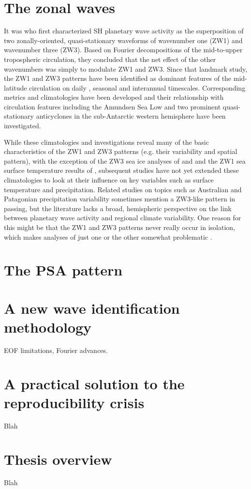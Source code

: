 \section{The zonal waves}

It was \citet{vanLoon1972} who first characterized SH planetary wave activity as the superposition of two zonally-oriented, quasi-stationary waveforms of wavenumber one (ZW1) and wavenumber three (ZW3). Based on Fourier decompositions of the mid-to-upper tropospheric circulation, they concluded that the net effect of the other wavenumbers was simply to modulate ZW1 and ZW3. Since that landmark study, the ZW1 and ZW3 patterns have been identified as dominant features of the mid-latitude circulation on daily \citep[e.g.][]{Kidson1988}, seasonal \citep[e.g.][]{Mo1985} and interannual \citep[e.g.][]{Karoly1989} timescales. Corresponding metrics and climatologies have been developed \citep{Raphael2004,Hobbs2007} and their relationship with circulation features including the Amundsen Sea Low \citep{Turner2013} and two prominent quasi-stationary anticyclones in the sub-Antarctic western hemisphere \citep{Hobbs2010} have been investigated.

While these climatologies and investigations reveal many of the basic characteristics of the ZW1 and ZW3 patterns (e.g. their variability and spatial pattern), with the exception of the ZW3 sea ice analyses of \citet{Raphael2007} and \citet{Yuan2008} and the ZW1 sea surface temperature results of \citet{Hobbs2007}, subsequent studies have not yet extended these climatologies to look at their influence on key variables such as surface temperature and precipitation. Related studies on topics such as Australian \citep{Frederiksen2014} and Patagonian \citep{Garreaud2013} precipitation variability sometimes mention a ZW3-like pattern in passing, but the literature lacks a broad, hemispheric perspective on the link between planetary wave activity and regional climate variability. One reason for this might be that the ZW1 and ZW3 patterns never really occur in isolation, which makes analyses of just one or the other somewhat problematic \citep{Hobbs2010}.


\section{The PSA pattern}




\section{A new wave identification methodology}

EOF limitations, Fourier advances.


\section{A practical solution to the reproducibility crisis}

Blah

\section{Thesis overview}

Blah
 